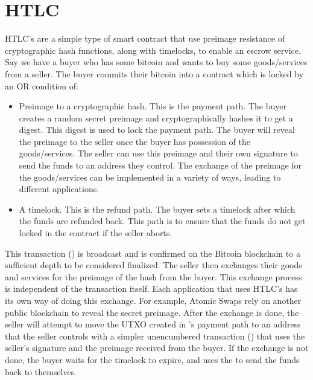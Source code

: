 \section{HTLC}
HTLC's are a simple type of smart contract that use preimage resistance of cryptographic hash functions, along with timelocks, to enable an escrow service. Say we have a buyer who has some bitcoin and wants to buy some goods/services from a seller. The buyer commits their bitcoin into a contract which is locked by an OR condition of:
\begin{itemize}
    \item Preimage to a cryptographic hash. This is the payment path. The buyer creates a random secret preimage and cryptographically hashes it to get a digest. This digest is used to lock the payment path. The buyer will reveal the preimage to the seller once the buyer has possession of the goods/services. The seller can use this preimage and their own signature to send the funds to an address they control. The exchange of the preimage for the goods/services can be implemented in a variety of ways, leading to different applications.
    \item A timelock. This is the refund path. The buyer sets a timelock after which the funds are refunded back. This path is to ensure that the funds do not get locked in the contract if the seller aborts. 
\end{itemize}

This transaction (\htlctxn{}) is broadcast and is confirmed on the Bitcoin blockchain to a sufficient depth to be considered finalized. The seller then exchanges their goods and services for the preimage of the hash from the buyer. This exchange process is independent of the transaction itself. Each application that uses HTLC's has its own way of doing this exchange. For example, Atomic Swaps rely on another public blockchain to reveal the secret preimage. After the exchange is done, the seller will attempt to move the UTXO created in \htlctxn{}'s payment path to an address that the seller controls with a simpler unencumbered transaction (\sellertxn{}) that uses the seller's signature and the preimage received from the buyer. If the exchange is not done, the buyer waits for the timelock to expire, and uses the  to send the funds back to themselves.

